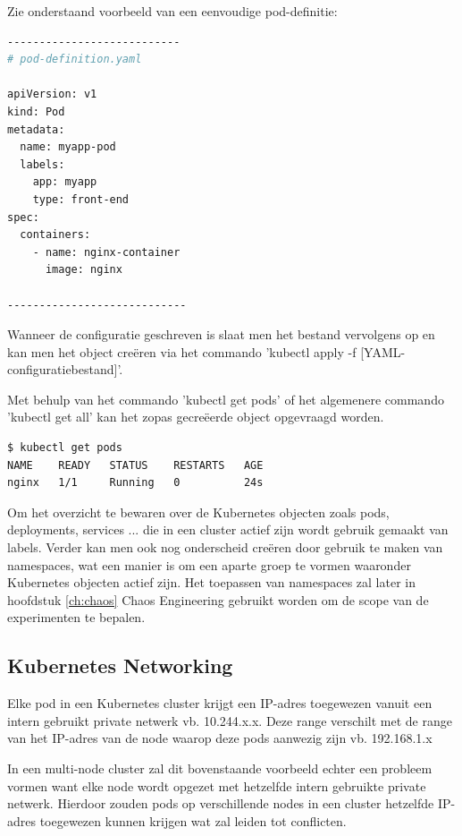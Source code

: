 Zie onderstaand voorbeeld van een eenvoudige pod-definitie:

\begin{lstlisting}[language=bash]
---------------------------
# pod-definition.yaml

apiVersion: v1
kind: Pod
metadata:
  name: myapp-pod
  labels:
    app: myapp
    type: front-end
spec:
  containers:
    - name: nginx-container
      image: nginx

----------------------------
\end{lstlisting}

Wanneer de configuratie geschreven is slaat men het bestand vervolgens op en kan men het object creëren via het commando 'kubectl apply -f [YAML-configuratiebestand]'. 

Met behulp van het commando 'kubectl get pods' of het algemenere commando 'kubectl get all' kan het zopas gecreëerde object opgevraagd worden. 

\begin{lstlisting}[language=bash]
$ kubectl get pods
NAME    READY   STATUS    RESTARTS   AGE
nginx   1/1     Running   0          24s
\end{lstlisting}

Om het overzicht te bewaren over de Kubernetes objecten zoals pods, deployments, services ... die in een cluster actief zijn wordt gebruik gemaakt van labels. Verder kan men ook nog onderscheid creëren door gebruik te maken van namespaces, wat een manier is om een aparte groep te vormen waaronder Kubernetes objecten actief zijn. Het toepassen van namespaces zal later in hoofdstuk \ref{ch:chaos} Chaos Engineering gebruikt worden om de scope van de experimenten te bepalen. 

\subsection{Kubernetes Networking}

Elke pod in een Kubernetes cluster krijgt een IP-adres toegewezen vanuit een intern gebruikt private netwerk vb. 10.244.x.x. 
Deze range verschilt met de range van het IP-adres van de node waarop deze pods aanwezig zijn vb. 192.168.1.x

In een multi-node cluster zal dit bovenstaande voorbeeld echter een probleem vormen want elke node wordt opgezet met hetzelfde intern gebruikte private netwerk. Hierdoor zouden pods op verschillende nodes in een cluster hetzelfde IP-adres toegewezen kunnen krijgen wat zal leiden tot conflicten.

